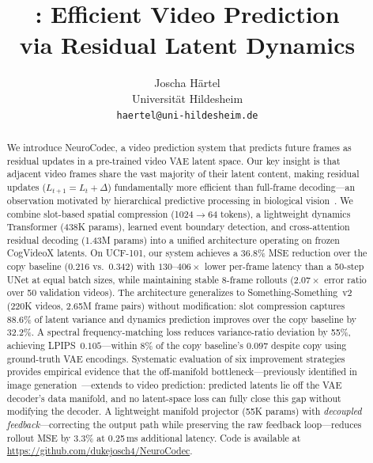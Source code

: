 \documentclass{article}
\title{\method{}: Efficient Video Prediction \\via Residual Latent Dynamics}
\author{
  Joscha H\"artel \\
  Universit\"at Hildesheim \\
  \texttt{haertel@uni-hildesheim.de}
}
\date{}
\newcommand{\method}{NeuroCodec}
\begin{document}
\maketitle

\begin{abstract}
We introduce \method{}, a video prediction system that predicts future
frames as residual updates in a pre-trained video VAE latent space.
Our key insight is that adjacent video frames share the vast majority of
their latent content, making residual updates
($L_{t+1} = L_t + \Delta$) fundamentally more efficient than full-frame
decoding---an observation motivated by hierarchical predictive
processing in biological vision~\cite{rao1999predictive}.
We combine slot-based spatial compression (1024$\to$64 tokens),
a lightweight dynamics Transformer (438K params), learned event boundary
detection, and cross-attention residual decoding (1.43M params) into
a unified architecture operating on frozen CogVideoX latents.
On UCF-101, our system achieves a 36.8\% MSE reduction over the copy
baseline (0.216 vs.\ 0.342) with $130$--$406\times$ lower per-frame
latency than a 50-step UNet at equal batch sizes, while maintaining
stable 8-frame rollouts ($2.07\times$ error ratio over 50 validation
videos).
The architecture generalizes to Something-Something~v2 (220K videos,
2.65M frame pairs) without modification: slot compression captures
88.6\% of latent variance and dynamics prediction improves over the copy
baseline by 32.2\%.
A spectral frequency-matching loss reduces variance-ratio deviation by
55\%, achieving LPIPS~$0.105$---within 8\% of the copy baseline's
$0.097$ despite copy using ground-truth VAE encodings.
Systematic evaluation of six improvement strategies provides empirical
evidence that the off-manifold bottleneck---previously identified in
image generation~\cite{zheng2025raedit}---extends to video prediction:
predicted latents lie off the VAE decoder's data manifold, and no
latent-space loss can fully close this gap without modifying the
decoder.
A lightweight manifold projector (55K params) with \emph{decoupled
feedback}---correcting the output path while preserving the raw
feedback loop---reduces rollout MSE by 3.3\% at 0.25\,ms additional
latency.
Code is available at \url{https://github.com/dukejosch4/NeuroCodec}.
\end{abstract}

\end{document}
